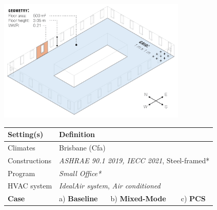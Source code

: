 
\begin{figure}[!h]
    \centering
    \includegraphics[width=0.8\textwidth]{manuscript/src/figures/sim-geometry.png}
    \vspace{0.5cm}

        \renewcommand{\arraystretch}{1.5}
    

        \begin{tabular}{ p{3.5cm} p{2cm} p{2cm} p{2cm} }
        
            \hline
            
            {\textbf{Setting(s)}} & \multicolumn{3}{l}{\textbf{Definition}} \\
        
            \hline
        
            {Climates}  & \multicolumn{3}{l}{Brisbane (Cfa)} \\
        
            
            {Constructions} & \multicolumn{3}{l}{\textit{ASHRAE 90.1 2019, IECC 2021}, Steel-framed*} \\
        
            
            {Program} & \multicolumn{3}{l}{\textit{Small Office*}} \\
            
        
            {HVAC system} & \multicolumn{3}{l}{\textit{IdealAir system}, \textit{Air conditioned}} \\
        

            {\textbf{Case}} & {a) \textbf{Baseline}} & {b) \textbf{Mixed-Mode}} & {c) \textbf{PCS}} \\


\end{tabular}
\end{figure}

